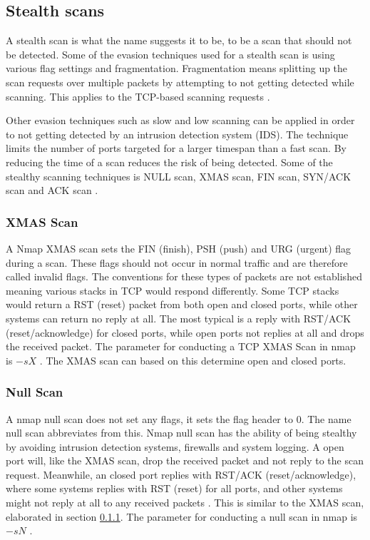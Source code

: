 \subsection{Stealth scans}
\label{s:StealthScan}
A stealth scan is what the name suggests it to be, to be a scan that should not be detected.
Some of the evasion techniques used for a stealth scan is using various flag settings and fragmentation.
Fragmentation means splitting up the scan requests over multiple packets by attempting to not getting detected while scanning. This applies to the TCP-based scanning requests \autocite{pinkard2008nmap}.

Other evasion techniques such as slow and low scanning can be applied in order to not getting detected by an intrusion detection system (IDS). The technique limits the number of ports targeted for a larger timespan than a fast scan. By reducing the time of a scan reduces the risk of being detected. Some of the stealthy scanning techniques is NULL scan, XMAS scan, FIN scan, SYN/ACK scan and ACK scan \autocite{pinkard2008nmap}.


\subsubsection{XMAS Scan}
\label{s:XMASScan}
A Nmap XMAS scan sets the FIN (finish), PSH (push) and URG (urgent) flag during a scan. These flags should not occur in normal traffic and are therefore called invalid flags. The conventions for these types of packets are not established meaning various stacks in TCP would respond differently. Some TCP stacks would return a RST (reset) packet from both open and closed ports, while other systems can return no reply at all. The most typical is a reply with RST/ACK (reset/acknowledge) for closed ports, while open ports not replies at all and drops the received packet.
The parameter for conducting a TCP XMAS Scan in nmap is $-sX$ \autocite{pinkard2008nmap, 10.5555/1538595}.
The XMAS scan can based on this determine open and closed ports.



\subsubsection{Null Scan}
\label{s:NullScan}
A nmap null scan does not set any flags, it sets the flag header to $0$. The name null scan abbreviates from this.
Nmap null scan has the ability of being stealthy by avoiding intrusion detection systems, firewalls and system logging.
A open port will, like the XMAS scan, drop the received packet and not reply to the scan request. Meanwhile, an closed port replies with RST/ACK (reset/acknowledge), where some systems replies with RST (reset) for all ports, and other systems might not reply at all to any received packets \autocite{pinkard2008nmap, 10.5555/1538595}. This is similar to the XMAS scan, elaborated in section \ref{s:XMASScan}. The parameter for conducting a null scan in nmap is $-sN$ \autocite{pinkard2008nmap}.


